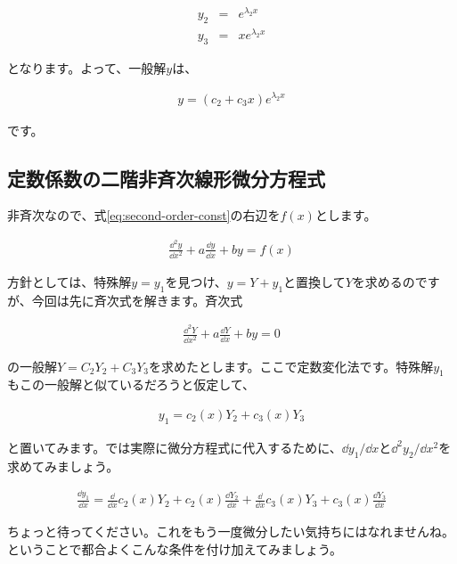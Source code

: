 \begin{eqnarray}
    y_2&=&e^{\lambda_2 x} \nonumber\\
    y_3&=&xe^{\lambda_2 x}
\end{eqnarray}

\noindent
となります。よって、一般解$y$は、

\begin{eqnarray}
    y=(c_2+c_3x)e^{\lambda_2 x}
\end{eqnarray}

\noindent
です。








\subsection{定数係数の二階非斉次線形微分方程式}
\label{second-order-constant-change}

非斉次なので、式\ref{eq:second-order-const}の右辺を$f(x)$とします。

\begin{eqnarray}
    \frac{\dd^2y}{\dd x^2}+a\frac{\dd y}{\dd x}+by=f(x)
    \label{eq:second-order-const-nhm}
\end{eqnarray}

方針としては、特殊解$y=y_1$を見つけ、$y=Y+y_1$と置換して$Y$を求めるのですが、今回は先に斉次式を解きます。斉次式

\begin{eqnarray}
    \frac{\dd^2Y}{\dd x^2}+a\frac{\dd Y}{\dd x}+by=0
\end{eqnarray}

\noindent
の一般解$Y=C_2Y_2+C_3Y_3$を求めたとします。ここで定数変化法です。特殊解$y_1$もこの一般解と似ているだろうと仮定して、

\begin{eqnarray}
    y_1=c_2(x)Y_2+c_3(x)Y_3
\end{eqnarray}

と置いてみます。では実際に微分方程式に代入するために、$\dd y_1/\dd x$と$\dd^2 y_2/\dd x^2$を求めてみましょう。

\begin{eqnarray}
    \frac{\dd y_1}{\dd x}=\frac{\dd}{\dd x}c_2(x)Y_2+c_2(x)\frac{\dd Y_2}{\dd x}+\frac{\dd}{\dd x}c_3(x)Y_3+c_3(x)\frac{\dd Y_3}{\dd x}
\end{eqnarray}

ちょっと待ってください。これをもう一度微分したい気持ちにはなれませんね。ということで都合よくこんな条件を付け加えてみましょう。

